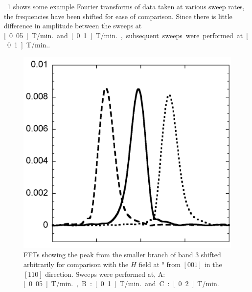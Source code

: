  \Fig~\ref{Fig:3:ComparisonSweepRates} shows some example Fourier transforms of data taken at various sweep rates, the frequencies have been shifted for ease of comparison. Since there is little difference in amplitude between the sweeps at \unit[0.05]{T/min.} and \unit[0.1]{T/min.}, subsequent sweeps were performed at \unit[0.1]{T/min.}.
\begin{figure}[h!]
    \begin{center}
        \includegraphics[scale=0.7]{Chapter3-dHvABaFe2P2/Figures/AngleDepMeasurements/SweepRateComparison/SweepRateComparison}
        \caption{FFTs showing the peak from the smaller branch of band $3$ shifted arbitrarily for comparison with the $H$ field at \unit[10]{\degree} from $[001]$ in the $[110]$ direction. Sweeps were performed at, A: \unit[0.05]{T/min.}, B: \unit[0.1]{T/min.} and C: \unit[0.2]{T/min.}}
        \label{Fig:3:ComparisonSweepRates}
    \end{center}
\end{figure}

